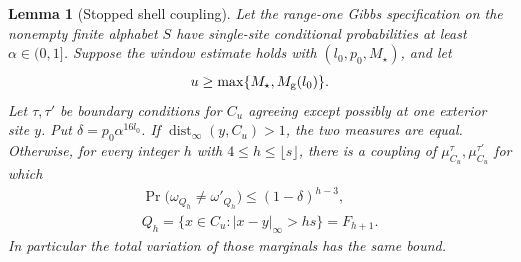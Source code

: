 \documentclass[11pt]{amsart}
\newtheorem{lemma}[theorem]{Lemma}
\theoremstyle{definition}
\newcommand{\dist}{\operatorname{dist}_\infty}
\newcommand{\1}{\mathbf 1}
\begin{document}
\begin{lemma}[Stopped shell coupling]
\label{lem:stopped}
Let the range-one Gibbs specification on the nonempty finite alphabet $S$
have single-site conditional probabilities at least $\alpha\in(0,1]$.
Suppose the window estimate holds with $(l_0,p_0,M_\star)$, and let
\[
 u\ge\max\{M_\star,M_{\rm g}(l_0)\}.
\]
Let $\tau,\tau'$ be boundary conditions for $C_u$ agreeing except
possibly at one exterior site $y$.
Put $\delta=p_0\alpha^{16l_0}$.
If $\dist(y,C_u)>1$, the two measures are equal. Otherwise, for every
integer $h$ with $4\le h\le\lfloor s\rfloor$, there is a coupling of
$\mu_{C_u}^\tau,\mu_{C_u}^{\tau'}$ for which
\begin{equation}\label{eq:stopped}
 \begin{gathered}
 \Pr\bigl(\omega_{Q_h}\ne\omega'_{Q_h}\bigr)
       \le(1-\delta)^{h-3},\\
 Q_h=\{x\in C_u:|x-y|_\infty>hs\}=F_{h+1}.
 \end{gathered}
\end{equation}
In particular the total variation of those marginals has the same bound.
\end{lemma}
\end{document}
